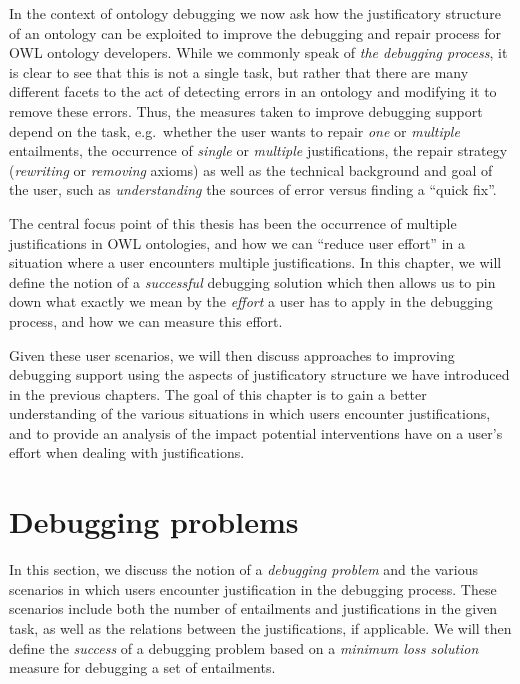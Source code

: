 In the context of ontology debugging we now ask how the justificatory structure of an ontology can be exploited to improve the debugging and repair process for OWL ontology developers. While we commonly speak of \emph{the debugging process}, it is clear to see that this is not a single task, but rather that there are many different facets to the act of detecting errors in an ontology and modifying it to remove these errors. Thus, the measures taken to improve debugging support depend on the task, e.g.\ whether the user wants to repair \emph{one} or \emph{multiple} entailments, the occurrence of \emph{single} or \emph{multiple} justifications, the repair strategy (\emph{rewriting} or \emph{removing} axioms) as well as the technical background and goal of the user, such as  \emph{understanding} the sources of error versus finding a \enquote{quick fix}. 

The central focus point of this thesis has been the occurrence of multiple justifications in OWL ontologies, and how we can \enquote{reduce user effort} in a situation where a user encounters multiple justifications. In this chapter, we will define the notion of a \emph{successful} debugging solution which then allows us to pin down what exactly we mean by the \emph{effort} a user has to apply in the debugging process, and how we can measure this effort.

Given these user scenarios, we will then discuss approaches to improving debugging support using the aspects of justificatory structure we have introduced in the previous chapters. The goal of this chapter is to gain a better understanding of the various situations in which users encounter justifications, and to provide an analysis of the impact potential interventions have on a user's effort when dealing with justifications.


\section{Debugging problems}

In this section, we discuss the notion of a \emph{debugging problem} and the various scenarios in which users encounter justification in the debugging process. These scenarios include both the number of entailments and justifications in the given task, as well as the relations between the justifications, if applicable. We will then define the \emph{success} of a debugging problem based on a \emph{minimum loss solution} measure for debugging a set of entailments.

